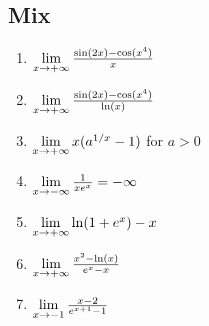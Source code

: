 \subsection{Mix}
\begin{enumerate}
    \item  $\lim\limits_{x \rightarrow +\infty}  \frac{ \sin(2x)-\cos(x^4)}{x}$
    \item  $\lim\limits_{x \rightarrow +\infty}  \frac{\sin(2x)-\cos(x^4)}{\ln(x)}$
    \item  $\lim\limits_{x \rightarrow +\infty} x(a^{1/x}-1)$ for $a>0$
    \item  $\lim\limits_{x \rightarrow -\infty}  \frac{1}{x e^x}=-\infty$
    \item  $\lim\limits_{x \rightarrow +\infty} \ln(1+e^x)-x$
    \item  $\lim\limits_{x \rightarrow +\infty}  \frac{x^2-\ln(x)}{e^x-x}$
    \item  $\lim\limits_{x \rightarrow -1}  \frac{x-2}{e^{x+1}-1}$

\end{enumerate}

% 
